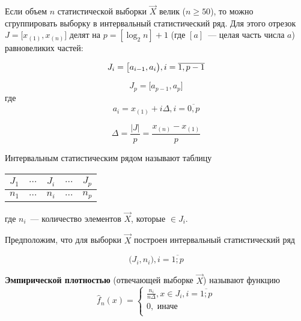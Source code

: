 Если объем $n$ статистической выборки $\vec X$ велик ($n \geq 50$), то можно сгруппировать выборку в интервальный статистический ряд. Для этого отрезок $J = \big[ x_{(1)}, x_{(n)} \big]$ делят на $p = [\log_2n] + 1$ (где $[a]$~--- целая часть числа $a$) равновеликих частей:

\begin{equation*}
    J_i = \big[ a_{i-1}, a_i \big), i = \overline{1, p-1} \\
\end{equation*}

\begin{equation*}
    J_{p} = \big[ a_{p-1}, a_p \big]
\end{equation*}
где
\begin{equation*}
    a_i = x_{(1)} + i\Delta, i = \overline{0, p}
\end{equation*}

\begin{equation*}
    \Delta = \frac{|J|}{p} = \frac{x_{(n)} - x_{(1)}}{p}
\end{equation*}

Интервальным статистическим рядом называют таблицу

\begin{table}[H]
    \centering
    \begin{tabular}{ccccc}
        \toprule
        $J_1$ & $\dots$ & $J_i$ & $\dots$ & $J_p$ \\
        \midrule
        $n_1$ & $\dots$ & $n_i$ & $\dots$ & $n_p$ \\
        \bottomrule
    \end{tabular}
\end{table}
где $n_i$~--- количество элементов $\overrightarrow X$, которые $\in J_i$.

Предположим, что для выборки $\overrightarrow X$ построен интервальный статистический
ряд

\begin{equation*}
    \big( J_i, n_i \big), i = \overline{1; p}
\end{equation*}

\textbf{Эмпирической плотностью} (отвечающей выборке $\overrightarrow X$) называют функцию
\begin{equation*}
    \hat f_n(x) =
    \begin{cases}
        \frac{n_i}{n \Delta}, x \in J_i, i = \overline{1; p} \\
        0, \text{ иначе} \\
    \end{cases}
\end{equation*}

